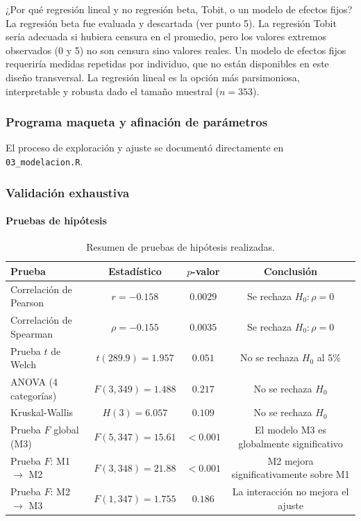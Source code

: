 \documentclass[12pt]{article}
\begin{document}
¿Por qué regresión lineal y no regresión beta, Tobit, o un modelo de efectos fijos? La regresión beta fue evaluada y descartada (ver punto 5). La regresión Tobit sería adecuada si hubiera censura en el promedio, pero los valores extremos observados (0 y 5) no son censura sino valores reales. Un modelo de efectos fijos requeriría medidas repetidas por individuo, que no están disponibles en este diseño transversal. La regresión lineal es la opción más parsimoniosa, interpretable y robusta dado el tamaño muestral (\(n = 353\)).

\subsubsection{Programa maqueta y afinación de parámetros}

El proceso de exploración y ajuste se documentó directamente en \texttt{03\_modelacion.R}.

\subsubsection{Validación exhaustiva}

\paragraph{Pruebas de hipótesis}

\begin{table}[H]
\centering
\caption{Resumen de pruebas de hipótesis realizadas.}
\begin{tabular}{lccc}
\toprule
Prueba & Estadístico & \(p\)-valor & Conclusión \\
\midrule
Correlación de Pearson & \(r = -0.158\) & \(0.0029\) & Se rechaza \(H_0: \rho = 0\) \\
Correlación de Spearman & \(\rho = -0.155\) & \(0.0035\) & Se rechaza \(H_0: \rho = 0\) \\
Prueba \(t\) de Welch & \(t(289.9) = 1.957\) & \(0.051\) & No se rechaza \(H_0\) al 5\% \\
ANOVA (4 categorías) & \(F(3, 349) = 1.488\) & \(0.217\) & No se rechaza \(H_0\) \\
Kruskal-Wallis & \(H(3) = 6.057\) & \(0.109\) & No se rechaza \(H_0\) \\
Prueba \(F\) global (M3) & \(F(5, 347) = 15.61\) & \(< 0.001\) & El modelo M3 es globalmente significativo \\
Prueba \(F\): M1 \(\rightarrow\) M2 & \(F(3, 348) = 21.88\) & \(< 0.001\) & M2 mejora significativamente sobre M1 \\
Prueba \(F\): M2 \(\rightarrow\) M3 & \(F(1, 347) = 1.755\) & \(0.186\) & La interacción no mejora el ajuste \\
\bottomrule
\end{tabular}
\label{tab:pruebas_hipotesis}
\end{table}
\end{document}
